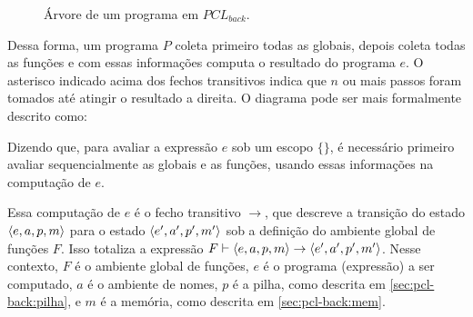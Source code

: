\begin{figure*}[ht]
	\centering
	\caption{Árvore de um programa em $PCL_{back}$.}
	\label{fig:tree-structure}
\end{figure*}

Dessa forma, um programa $P$ coleta primeiro todas as globais, depois coleta todas as funções e com essas informações computa o resultado do programa $e$. O asterisco indicado acima dos fechos transitivos indica que $n$ ou mais passos foram tomados até atingir o resultado a direita. O diagrama pode ser mais formalmente descrito como:

\noindent Dizendo que, para avaliar a expressão $e$ sob um escopo $\{\}$, é necessário primeiro avaliar sequencialmente as globais e as funções, usando essas informações na computação de $e$.

Essa computação de $e$ é o fecho transitivo $\to$, que descreve a transição do estado $\langle e, a, p, m \rangle$ para o estado $\langle e', a', p', m' \rangle$ sob a definição do ambiente global de funções $F$. Isso totaliza a expressão $F \vdash \langle e, a, p, m \rangle \to \langle e', a', p', m' \rangle$. Nesse contexto, $F$ é o ambiente global de funções, $e$ é o programa (expressão) a ser computado, $a$ é o ambiente de nomes, $p$ é a pilha, como descrita em \ref{sec:pcl-back:pilha}, e $m$ é a memória, como descrita em \ref{sec:pcl-back:mem}.

